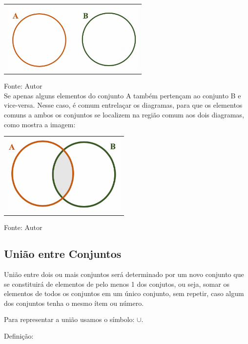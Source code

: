 \begin{multicols*}{2}
		\begin{tabular}{@{}c@{}}
		  \includegraphics[height=35mm]{assets/Conjunto Disjunto.png}
		\end{tabular}
		
		Fonte: Autor\\
		
	Se apenas alguns elementos do conjunto A também pertençam ao conjunto B e vice-versa. Nesse caso, é comum entrelaçar os diagramas, para que os elementos comuns a ambos os conjuntos se localizem na região comum aos dois diagramas, como mostra a imagem:\\
	
		\begin{tabular}{@{}c@{}}
		  \includegraphics[height=40mm]{assets/Conjunto Intersecção.png}
		\end{tabular}   	
	
		Fonte: Autor\\
			
	\subsection{União entre Conjuntos}
	
	União entre dois ou mais conjuntos será determinado por um novo conjunto que se constituirá de elementos de pelo menos 1 dos conjutos, ou seja, somar os elementos de todos os conjuntos em um único conjunto, sem repetir, caso algum dos conjuntos tenha o mesmo ítem ou número.
	
	Para representar a união usamos o símbolo: $ \mathbf{ \cup } $.
	
	Definição:
	
	

\end{multicols*}
